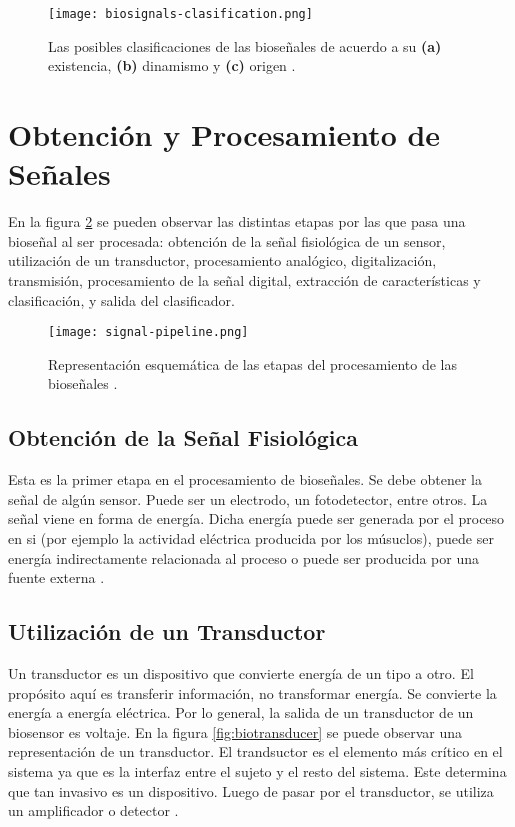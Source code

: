 \begin{figure}[H]
	\centering
    \texttt{[image: biosignals-clasification.png]}
    \caption{Las posibles clasificaciones de las bioseñales de acuerdo a su \textbf{(a)} existencia, \textbf{(b)} dinamismo y \textbf{(c)} origen \cite{biosignal-book-2}.}
	\label{fig:biosignals-clasification}
\end{figure}

\section{Obtención y Procesamiento de Señales}

En la figura \ref{fig:signal-pipeline} se pueden observar las distintas etapas por las que pasa una bioseñal al ser procesada: obtención de la señal fisiológica de un sensor, utilización de un transductor, procesamiento analógico, digitalización, transmisión, procesamiento de la señal digital, extracción de características y clasificación, y salida del clasificador.

\begin{figure}[H]
	\centering
    \texttt{[image: signal-pipeline.png]}
    \caption{Representación esquemática de las etapas del procesamiento de las bioseñales \cite{biosignal-book}.}
	\label{fig:signal-pipeline}
\end{figure}

\subsection{Obtención de la Señal Fisiológica}

Esta es la primer etapa en el procesamiento de bioseñales. Se debe obtener la señal de algún sensor. Puede ser un electrodo, un fotodetector, entre otros. La  señal viene en forma de energía. Dicha energía puede ser generada por el proceso en si (por ejemplo la actividad eléctrica producida por los músuclos), puede ser energía indirectamente relacionada al proceso o puede ser producida por una fuente externa \cite{biosignal-book}.

\subsection{Utilización de un Transductor}

Un transductor es un dispositivo que convierte energía de un tipo a otro. El propósito aquí es transferir información, no transformar energía. Se convierte la energía a energía eléctrica. Por lo general, la salida de un transductor de un biosensor es voltaje. En la figura \ref{fig:biotransducer} se puede observar una representación de un transductor. El trandsuctor es el elemento más crítico en el sistema ya que es la interfaz entre el sujeto y el resto del sistema. Este determina que tan invasivo es un dispositivo. Luego de pasar por el transductor, se utiliza un amplificador o detector \cite{biosignal-book}.

